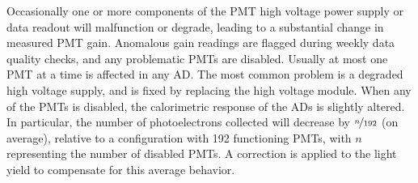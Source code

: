 Occasionally one or more components of the PMT high voltage power supply
or data readout will malfunction or degrade,
leading to a substantial change in measured PMT gain.
Anomalous gain readings are flagged during weekly data quality checks,
and any problematic PMTs are disabled.
Usually at most one PMT at a time is affected in any AD.
The most common problem is a degraded high voltage supply,
and is fixed by replacing the high voltage module.
When any of the PMTs is disabled, the calorimetric response of the ADs
is slightly altered.
In particular, the number of photoelectrons collected
will decrease by $\nicefrac{n}{192}$ (on average),
relative to a configuration with \num{192} functioning PMTs,
with $n$ representing the number of disabled PMTs.
A correction is applied to the light yield to compensate for this average behavior.

